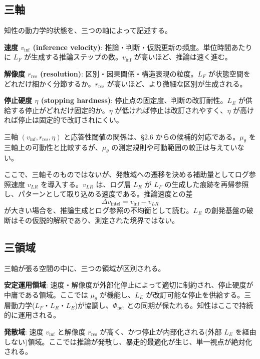 \bigskip


\subsection{三軸}


知性の動力学的状態を、三つの軸によって記述する。

\textbf{速度 $v_{\text{inf}}$ (inference velocity)}:
推論・判断・仮説更新の頻度。単位時間あたりに $L_F$ が生成する推論ステップの数。$v_{\text{inf}}$ が高いほど、推論は速く進む。

\textbf{解像度 $r_{\text{res}}$ (resolution)}:
区別・因果関係・構造表現の粒度。$L_F$ が状態空間をどれだけ細かく分節するか。$r_{\text{res}}$ が高いほど、より微細な区別が生成される。

\textbf{停止硬度 $\eta$ (stopping hardness)}:
停止点の固定度、判断の改訂耐性。$L_E$ が供給する停止がどれだけ固定的か。$\eta$ が低ければ停止は改訂されやすく、$\eta$ が高ければ停止は固定的で改訂されにくい。

三軸 $(v_{\text{inf}}, r_{\text{res}}, \eta)$ と応答性閾値の関係は、\S{}2.6 からの候補的対応である。$\mu_\theta$ を三軸上の可動性と比較するが、$\mu_\theta$ の測定規則や可動範囲の較正は与えていない。

ここで、三軸そのものではないが、発散域への遷移を決める補助量としてログ参照速度 $v_{LR}$ を導入する。$v_{LR}$ は、ログ層 $L_R$ が $L_F$ の生成した痕跡を再帰参照し、パターンとして取り込める速度である。推論速度との差
\[
\Delta v_{\text{intel}} = v_{\text{inf}} - v_{LR}
\]
が大きい場合を、推論生成とログ参照の不均衡として読む。$L_E$ の創発基盤の破断はその仮説的解釈であり、測定された境界ではない。

\bigskip


\subsection{三領域}


三軸が張る空間の中に、三つの領域が区別される。

\textbf{安定運用領域}:
速度・解像度が外部化停止によって適切に制約され、停止硬度が中庸である領域。ここでは $\mu_\theta$ が機能し、$L_E$ が改訂可能な停止を供給する。三層動力学($L_F$・$L_R$・$L_E$)が協調し、$\Phi_{\text{net}}$ との同期が保たれる。知性はここで持続的に運用される。

\textbf{発散域}:
速度 $v_{\text{inf}}$ と解像度 $r_{\text{res}}$ が高く、かつ停止が内部化される(外部 $L_E$ を経由しない)領域。ここでは推論が発散し、暴走的最適化が生じ、単一視点が絶対化される。

